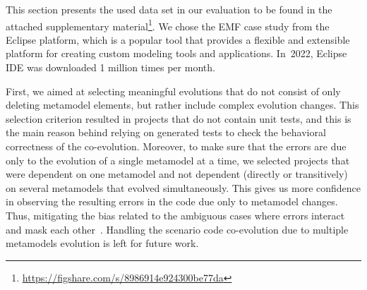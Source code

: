 This section presents the used data set in our evaluation to be found in the attached supplementary material\footnote{\url{https://figshare.com/s/8986914e924300be77da}}.
%
We chose the EMF case study from the Eclipse platform, which is a popular tool that provides a flexible and extensible platform for creating custom modeling tools and applications. In~2022, Eclipse IDE was downloaded 1 million times per month.

First, we aimed at selecting meaningful evolutions that do not consist of only deleting metamodel elements, but rather include complex evolution changes. 
\red{}This selection criterion resulted in projects that do not contain unit tests, and this is the main reason behind relying on generated tests to check the behavioral correctness of the co-evolution. %
Moreover, to make sure that the errors are due only to the evolution of a single metamodel at a time, we selected projects that were dependent on one metamodel and not dependent (directly or transitively) on several metamodels that evolved simultaneously. This gives us more confidence in observing the resulting errors in the code due only to metamodel changes. Thus, mitigating the bias related to the ambiguous cases where errors interact and mask each other~\cite{bohme2013regression}. Handling the scenario code co-evolution due to multiple metamodels evolution is left for future work. 

